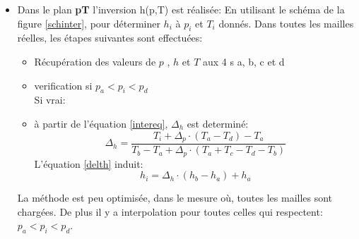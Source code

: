 \begin{itemize}
      \vspace{0.5cm}
      \item[\textbullet] Dans le plan \textbf{pT} l'inversion h(p,T) est réalisée:
      \smallbreak\vspace{0.3cm}
      En utilisant le schéma de la figure \ref{schinter}, pour déterminer $h_i$ à $p_i$ et $T_i$ donnés.
      \smallbreak\vspace{0.2cm}
      Dans toutes les mailles réelles, les étapes suivantes sont effectuées:
      \begin{itemize}
	\item Récupération des valeurs de $p$ , $h$ et $T$ aux 4 \n s a, b, c et d 
	\item verification si $p_a < p_i < p_d$\\
	Si vrai:
	\item à partir de l'équation \ref{intereq}, $\Delta_h$ est determiné: 
	\begin{equation}
	  \label{delheq}
	  \Delta_h = \frac{T_i + \Delta_p\cdot(T_a - T_d) - T_a}{T_b - T_a + \Delta_p\cdot(T_a + T_c - T_d - T_b)}
	\end{equation}
	L'équation \ref{delth} induit: 
	\begin{equation}
	h_i = \Delta_h\cdot(h_b - h_a) + h_a
	\end{equation}	
      \end{itemize}
      La méthode est peu optimisée, dans le mesure où, toutes les mailles sont chargées. 
      De plus il y a interpolation pour toutes celles qui respectent: $p_a < p_i < p_d$.
      
      
    \end{itemize}
    
   
    
 
  
  
  \clearpage
      

\clearpage

